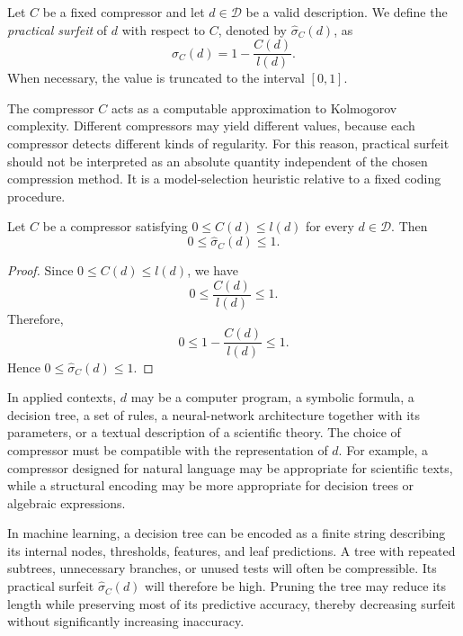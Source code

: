 \begin{definition}
Let \(C\) be a fixed compressor and let \(d\in\mathcal D\) be a valid description. We define the \emph{practical surfeit} of \(d\) with respect to \(C\), denoted by \(\hat{\sigma}_C(d)\), as
\[
\hat{\sigma}_C(d)
=
1-\frac{C(d)}{l(d)}.
\]
When necessary, the value is truncated to the interval \([0,1]\).
\end{definition}

The compressor \(C\) acts as a computable approximation to Kolmogorov complexity. Different compressors may yield different values, because each compressor detects different kinds of regularity. For this reason, practical surfeit should not be interpreted as an absolute quantity independent of the chosen compression method. It is a model-selection heuristic relative to a fixed coding procedure.

\begin{proposition}
\label{prop:practical_surfeit_range}
Let \(C\) be a compressor satisfying \(0\leq C(d)\leq l(d)\) for every \(d\in\mathcal D\). Then
\[
0\leq \hat{\sigma}_C(d)\leq 1.
\]
\end{proposition}

\begin{proof}
Since \(0\leq C(d)\leq l(d)\), we have
\[
0\leq \frac{C(d)}{l(d)}\leq 1.
\]
Therefore,
\[
0\leq 1-\frac{C(d)}{l(d)}\leq 1.
\]
Hence \(0\leq \hat{\sigma}_C(d)\leq 1\).
\end{proof}

In applied contexts, \(d\) may be a computer program, a symbolic formula, a decision tree, a set of rules, a neural-network architecture together with its parameters, or a textual description of a scientific theory. The choice of compressor must be compatible with the representation of \(d\). For example, a compressor designed for natural language may be appropriate for scientific texts, while a structural encoding may be more appropriate for decision trees or algebraic expressions.

\begin{example}
In machine learning, a decision tree can be encoded as a finite string describing its internal nodes, thresholds, features, and leaf predictions. A tree with repeated subtrees, unnecessary branches, or unused tests will often be compressible. Its practical surfeit \(\hat{\sigma}_C(d)\) will therefore be high. Pruning the tree may reduce its length while preserving most of its predictive accuracy, thereby decreasing surfeit without significantly increasing inaccuracy.
\end{example}

